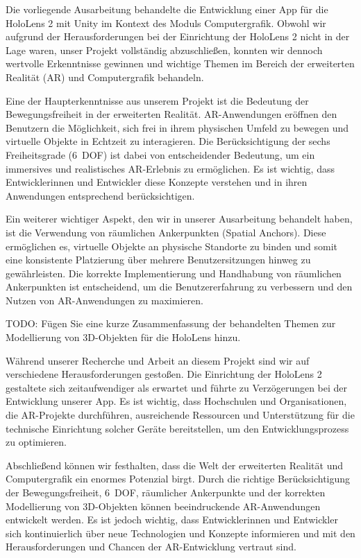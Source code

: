 Die vorliegende Ausarbeitung behandelte die Entwicklung einer App für die HoloLens 2 mit Unity im Kontext des Moduls Computergrafik.
Obwohl wir aufgrund der Herausforderungen bei der Einrichtung der HoloLens 2 nicht in der Lage waren, unser Projekt vollständig abzuschließen, konnten wir dennoch wertvolle Erkenntnisse gewinnen und wichtige Themen im Bereich der erweiterten Realität (AR) und Computergrafik behandeln.


Eine der Haupterkenntnisse aus unserem Projekt ist die Bedeutung der Bewegungsfreiheit in der erweiterten Realität.
AR-Anwendungen eröffnen den Benutzern die Möglichkeit, sich frei in ihrem physischen Umfeld zu bewegen und virtuelle Objekte in Echtzeit zu interagieren.
Die Berücksichtigung der sechs Freiheitsgrade (6~DOF) ist dabei von entscheidender Bedeutung, um ein immersives und realistisches AR-Erlebnis zu ermöglichen.
Es ist wichtig, dass Entwicklerinnen und Entwickler diese Konzepte verstehen und in ihren Anwendungen entsprechend berücksichtigen.


Ein weiterer wichtiger Aspekt, den wir in unserer Ausarbeitung behandelt haben, ist die Verwendung von räumlichen Ankerpunkten (Spatial Anchors).
Diese ermöglichen es, virtuelle Objekte an physische Standorte zu binden und somit eine konsistente Platzierung über mehrere Benutzersitzungen hinweg zu gewährleisten.
Die korrekte Implementierung und Handhabung von räumlichen Ankerpunkten ist entscheidend, um die Benutzererfahrung zu verbessern und den Nutzen von AR-Anwendungen zu maximieren.


TODO: Fügen Sie eine kurze Zusammenfassung der behandelten Themen zur Modellierung von 3D-Objekten für die HoloLens hinzu.


Während unserer Recherche und Arbeit an diesem Projekt sind wir auf verschiedene Herausforderungen gestoßen.
Die Einrichtung der HoloLens 2 gestaltete sich zeitaufwendiger als erwartet und führte zu Verzögerungen bei der Entwicklung unserer App.
Es ist wichtig, dass Hochschulen und Organisationen, die AR-Projekte durchführen, ausreichende Ressourcen und Unterstützung für die technische Einrichtung solcher Geräte bereitstellen, um den Entwicklungsprozess zu optimieren.


Abschließend können wir festhalten, dass die Welt der erweiterten Realität und Computergrafik ein enormes Potenzial birgt.
Durch die richtige Berücksichtigung der Bewegungsfreiheit, 6~DOF, räumlicher Ankerpunkte und der korrekten Modellierung von 3D-Objekten können beeindruckende AR-Anwendungen entwickelt werden.
Es ist jedoch wichtig, dass Entwicklerinnen und Entwickler sich kontinuierlich über neue Technologien und Konzepte informieren und mit den Herausforderungen und Chancen der AR-Entwicklung vertraut sind.


